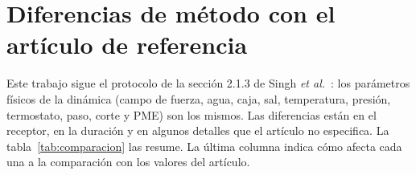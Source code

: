 \documentclass[11pt,a4paper]{article}
\begin{document}
\section{Diferencias de método con el artículo de referencia}
\label{sec:comparacion}

Este trabajo sigue el protocolo de la sección 2.1.3 de Singh \textit{et al.}\ \cite{singh2022}: los
parámetros físicos de la dinámica (campo de fuerza, agua, caja, sal, temperatura, presión, termostato, paso,
corte y PME) son los mismos. Las diferencias están en el receptor, en la duración y en algunos detalles que
el artículo no especifica. La tabla~\ref{tab:comparacion} las resume. La última columna indica cómo afecta
cada una a la comparación con los valores del artículo.
\end{document}
